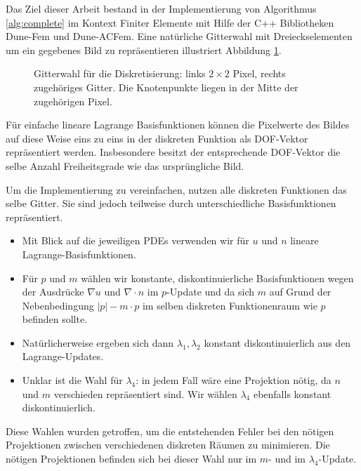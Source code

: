 \documentclass{mythesis}
\begin{document}
Das Ziel dieser Arbeit bestand in der Implementierung von Algorithmus \ref{alg:complete} im Kontext Finiter Elemente mit Hilfe der C++ Bibliotheken Dune-Fem und Dune-ACFem.
Eine natürliche Gitterwahl mit Dreieckselementen um ein gegebenes Bild zu repräsentieren illustriert Abbildung \ref{fig:grid}.
\begin{figure}[ht]
    \begin{subfigure}{0.5\textwidth}
	\centering
    \end{subfigure}%
    \begin{subfigure}{0.5\textwidth}
	\centering
    \end{subfigure}
    \caption{Gitterwahl für die Diskretisierung: links $2\times 2$ Pixel, rechts zugehöriges Gitter. Die Knotenpunkte liegen in der Mitte der zugehörigen Pixel.}
    \label{fig:grid}
\end{figure}
Für einfache lineare Lagrange Basisfunktionen können die Pixelwerte des Bildes auf diese Weise eins zu eins in der diskreten Funktion als DOF-Vektor repräsentiert werden.
Insbesondere besitzt der entsprechende DOF-Vektor die selbe Anzahl Freiheitsgrade wie das ursprüngliche Bild.

Um die Implementierung zu vereinfachen, nutzen alle diskreten Funktionen das selbe Gitter.
Sie sind jedoch teilweise durch unterschiedliche Basisfunktionen repräsentiert.
\begin{itemize}
    \item
	Mit Blick auf die jeweiligen PDEs verwenden wir für $u$ und $n$ lineare Lagrange-Basisfunktionen.
    \item
	Für $p$ und $m$ wählen wir konstante, diskontinuierliche Basisfunktionen wegen der Ausdrücke $\nabla u$ und $\nabla \cdot n$ im $p$-Update und da sich $m$ auf Grund der Nebenbedingung $|p| - m\cdot p$ im selben diskreten Funktionenraum wie $p$ befinden sollte.
    \item
	Natürlicherweise ergeben sich dann $\lambda_1, \lambda_2$ konstant diskontinuierlich aus den Lagrange-Updates.
    \item
	Unklar ist die Wahl für $\lambda_4$: in jedem Fall wäre eine Projektion nötig, da $n$ und $m$ verschieden repräsentiert sind.
	Wir wählen $\lambda_4$ ebenfalls konstant diskontinuierlich.
\end{itemize}
Diese Wahlen wurden getroffen, um die entstehenden Fehler bei den nötigen Projektionen zwischen verschiedenen diskreten Räumen zu minimieren.
Die nötigen Projektionen befinden sich bei dieser Wahl nur im $m$- und im $\lambda_4$-Update.
\end{document}
